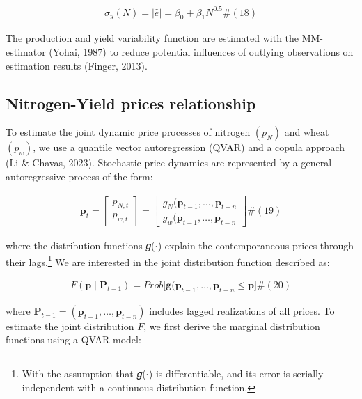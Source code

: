 \documentclass[
]{article}
\begin{document}
\[\begin{array}{r}
\sigma_{y}(N) = \left| \widehat{e} \right| = \beta_{0} + \beta_{1}N^{0.5}\#(18)
\end{array}\]

The production and yield variability function are estimated with the
MM-estimator (Yohai, 1987) to reduce potential influences of outlying
observations on estimation results (Finger, 2013).

\subsection{\texorpdfstring{Nitrogen-Yield prices relationship
}{Nitrogen-Yield prices relationship }}\label{nitrogen-yield-prices-relationship}

To estimate the joint dynamic price processes of nitrogen \((p_{N})\)
and wheat \((p_{w})\), we use a quantile vector autoregression (QVAR)
and a copula approach (Li \& Chavas, 2023). Stochastic price dynamics
are represented by a general autoregressive process of the form:

\[\begin{array}{r}
\mathbf{p}_{t} = \begin{bmatrix}
p_{N,t} \\
p_{w,t}
\end{bmatrix} = \begin{bmatrix}
g_{N}(\mathbf{p}_{t - 1},\ldots,\mathbf{p}_{t - n} \\
g_{w}(\mathbf{p}_{t - 1},\ldots,\mathbf{p}_{t - n}
\end{bmatrix}\#(19)
\end{array}\]

where the distribution functions 𝑔(⋅) explain the contemporaneous prices
through their lags.\footnote{With the assumption that 𝑔(⋅) is
  differentiable, and its error is serially independent with a
  continuous distribution function.} We are interested in the joint
distribution function described as:

\[\begin{array}{r}
F\left( \mathbf{p} \middle| \mathbf{P}_{t - 1} \right) = Prob\lbrack\mathbf{g}(\mathbf{p}_{t - 1},\ldots,\mathbf{p}_{t - n} \leq \mathbf{p}\rbrack\#(20)
\end{array}\]

where
\(\mathbf{P}_{t - 1} = (\mathbf{p}_{t - 1},\ldots,\mathbf{p}_{t - n})\)
includes lagged realizations of all prices. To estimate the joint
distribution \(F\), we first derive the marginal distribution functions
using a QVAR model:
\end{document}
